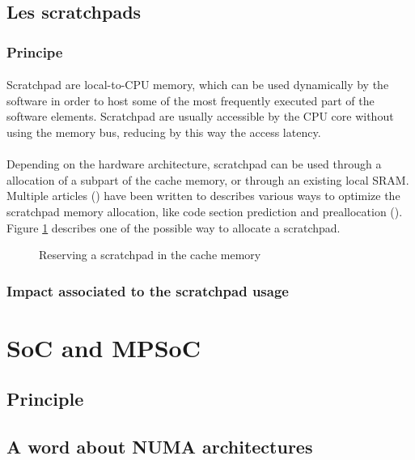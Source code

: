 \subsection{Les scratchpads}

\subsubsection{Principe}

\paragraph{}
Scratchpad are local-to-CPU memory, which can be used dynamically by the software in order to host
some of the most frequently executed part of the software elements. Scratchpad are usually
accessible by the CPU core without using the memory bus, reducing by this way the access latency.

\paragraph{}
Depending on the hardware architecture, scratchpad can be used through a allocation of a subpart of
the cache memory, or through an existing local SRAM. Multiple articles () have
been written to describes various ways to optimize the scratchpad memory allocation, like code
section prediction and preallocation ().\\
Figure \ref{fig:cache_scratchpad_simple} describes one of the possible way to allocate a scratchpad.

\begin{figure}

\caption{Reserving a scratchpad in the cache memory}
\label{fig:cache_scratchpad_simple}
\end{figure}

\subsubsection{Impact associated to the scratchpad usage}


\section{SoC and MPSoC}

\subsection{Principle}

\subsection{A word about NUMA architectures}
